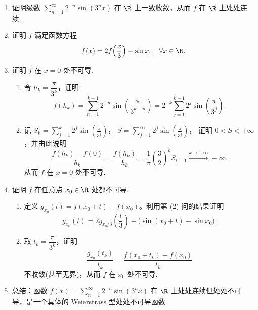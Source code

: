 \begin{enumerate}
    \item[1.]证明级数 $\displaystyle\sum_{n=1}^{\infty}2^{-n}\sin(3^{n}x)$ 在 $\R$ 上一致收敛，从而 $f$ 在 $\R$ 上处处连续.
    \item[2.]证明 $f$ 满足函数方程
    \[
    \displaystyle f(x)=2f\!\left(\frac{x}{3}\right)-\sin x,\quad\forall x\in\R.
    \]
    \item[3.]证明 $f$ 在 $x=0$ 处不可导.
    \begin{enumerate}
        \item[(a)] 令 $h_k=\dfrac{\pi}{3^k}$，证明
        \[
        \displaystyle f(h_k)=\sum_{n=1}^{k-1}2^{-n}\sin\!\left(\frac{\pi}{3^{k-n}}\right)=2^{-k}\sum_{j=1}^{k-1}2^{j}\sin\!\left(\frac{\pi}{3^{j}}\right).
        \]
        \item[(b)] 记 $S_k=\displaystyle\sum_{j=1}^{k}2^{j}\sin\!\left(\frac{\pi}{3^{j}}\right)$，
        $S=\displaystyle\sum_{j=1}^{\infty}2^{j}\sin\!\left(\frac{\pi}{3^{j}}\right)$，
        证明 $0<S<+\infty$，并由此说明
        \[
        \frac{f(h_k)-f(0)}{h_k}=\frac{f(h_k)}{h_k}=\frac{1}{\pi}\left(\frac{3}{2}\right)^kS_{k-1}
        \xrightarrow{k\to+\infty}+\infty.
        \]
        从而 $f$ 在 $x=0$ 处不可导.
    \end{enumerate}
    \item[4.]证明 $f$ 在任意点 $x_0\in\R$ 处都不可导.
    \begin{enumerate}
        \item[(a)] 定义 $g_{x_0}(t)=f(x_0+t)-f(x_0)$。利用第 (2) 问的结果证明
        \[
        \displaystyle g_{x_0}(t)=2g_{x_0/3}\!\left(\frac{t}{3}\right)-\bigl(\sin(x_0+t)-\sin x_0\bigr).
        \]
        \item[(b)] 取 $\displaystyle t_k=\dfrac{\pi}{3^k}$，证明
        \[
        \displaystyle\frac{g_{x_0}(t_k)}{t_k}=\frac{f(x_0+t_k)-f(x_0)}{t_k}
        \]
        不收敛(甚至无界)，从而 $f$ 在 $x_0$ 处不可导.
    \end{enumerate}
    \item[5.]总结：函数 $\displaystyle f(x)=\sum_{n=1}^{\infty}2^{-n}\sin(3^n x)$ 在 $\R$ 上处处连续但处处不可导，是一个具体的 Weierstrass 型处处不可导函数.
\end{enumerate}
